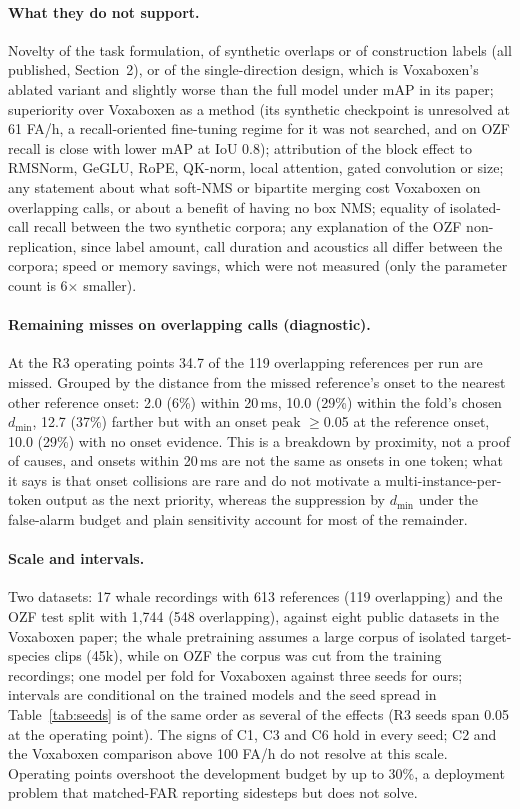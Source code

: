 \documentclass[10pt,twocolumn]{article}
\begin{document}
\paragraph{What they do not support.} Novelty of the task formulation, of synthetic overlaps or of construction labels (all published, Section~2), or of the single-direction design, which is Voxaboxen's ablated variant and slightly worse than the full model under mAP in its paper; superiority over Voxaboxen as a method (its synthetic checkpoint is unresolved at 61 FA/h, a recall-oriented fine-tuning regime for it was not searched, and on OZF recall is close with lower mAP at IoU 0.8); attribution of the block effect to RMSNorm, GeGLU, RoPE, QK-norm, local attention, gated convolution or size; any statement about what soft-NMS or bipartite merging cost Voxaboxen on overlapping calls, or about a benefit of having no box NMS; equality of isolated-call recall between the two synthetic corpora; any explanation of the OZF non-replication, since label amount, call duration and acoustics all differ between the corpora; speed or memory savings, which were not measured (only the parameter count is 6$\times$ smaller).
\paragraph{Remaining misses on overlapping calls (diagnostic).} At the R3 operating points 34.7 of the 119 overlapping references per run are missed. Grouped by the distance from the missed reference's onset to the nearest other reference onset: 2.0 (6\%) within 20\,ms, 10.0 (29\%) within the fold's chosen $d_{\min}$, 12.7 (37\%) farther but with an onset peak $\ge$0.05 at the reference onset, 10.0 (29\%) with no onset evidence. This is a breakdown by proximity, not a proof of causes, and onsets within 20\,ms are not the same as onsets in one token; what it says is that onset collisions are rare and do not motivate a multi-instance-per-token output as the next priority, whereas the suppression by $d_{\min}$ under the false-alarm budget and plain sensitivity account for most of the remainder.
\paragraph{Scale and intervals.} Two datasets: 17 whale recordings with 613 references (119 overlapping) and the OZF test split with 1{,}744 (548 overlapping), against eight public datasets in the Voxaboxen paper; the whale pretraining assumes a large corpus of isolated target-species clips (45k), while on OZF the corpus was cut from the training recordings; one model per fold for Voxaboxen against three seeds for ours; intervals are conditional on the trained models and the seed spread in Table~\ref{tab:seeds} is of the same order as several of the effects (R3 seeds span 0.05 at the operating point). The signs of C1, C3 and C6 hold in every seed; C2 and the Voxaboxen comparison above 100 FA/h do not resolve at this scale. Operating points overshoot the development budget by up to 30\%, a deployment problem that matched-FAR reporting sidesteps but does not solve.
\end{document}

